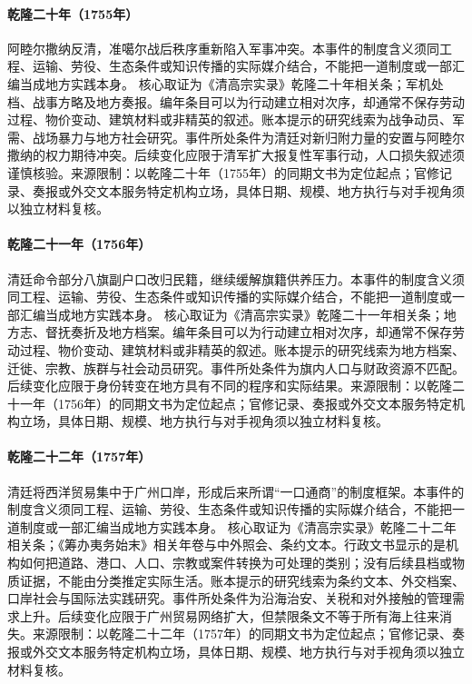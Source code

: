 \hypertarget{civic:EQ-1755-AMURSANA-REVOLT}{}\paragraph{乾隆二十年（1755年）}阿睦尔撒纳反清，准噶尔战后秩序重新陷入军事冲突。本事件的制度含义须同工程、运输、劳役、生态条件或知识传播的实际媒介结合，不能把一道制度或一部汇编当成地方实践本身。 核心取证为《清高宗实录》乾隆二十年相关条；军机处档、战事方略及地方奏报。编年条目可以为行动建立相对次序，却通常不保存劳动过程、物价变动、建筑材料或非精英的叙述。账本提示的研究线索为战争动员、军需、战场暴力与地方社会研究。事件所处条件为清廷对新归附力量的安置与阿睦尔撒纳的权力期待冲突。后续变化应限于清军扩大报复性军事行动，人口损失叙述须谨慎核验。来源限制：以乾隆二十年（1755年）的同期文书为定位起点；官修记录、奏报或外交文本服务特定机构立场，具体日期、规模、地方执行与对手视角须以独立材料复核。
\hypertarget{civic:EQ-1756-BANNER-CIVILIAN-REGISTRATION}{}\paragraph{乾隆二十一年（1756年）}清廷命令部分八旗副户口改归民籍，继续缓解旗籍供养压力。本事件的制度含义须同工程、运输、劳役、生态条件或知识传播的实际媒介结合，不能把一道制度或一部汇编当成地方实践本身。 核心取证为《清高宗实录》乾隆二十一年相关条；地方志、督抚奏折及地方档案。编年条目可以为行动建立相对次序，却通常不保存劳动过程、物价变动、建筑材料或非精英的叙述。账本提示的研究线索为地方档案、迁徙、宗教、族群与社会动员研究。事件所处条件为旗内人口与财政资源不匹配。后续变化应限于身份转变在地方具有不同的程序和实际结果。来源限制：以乾隆二十一年（1756年）的同期文书为定位起点；官修记录、奏报或外交文本服务特定机构立场，具体日期、规模、地方执行与对手视角须以独立材料复核。
\hypertarget{civic:EQ-1757-CANTON-TRADE-RESTRICTION}{}\paragraph{乾隆二十二年（1757年）}清廷将西洋贸易集中于广州口岸，形成后来所谓“一口通商”的制度框架。本事件的制度含义须同工程、运输、劳役、生态条件或知识传播的实际媒介结合，不能把一道制度或一部汇编当成地方实践本身。 核心取证为《清高宗实录》乾隆二十二年相关条；《筹办夷务始末》相关年卷与中外照会、条约文本。行政文书显示的是机构如何把道路、港口、人口、宗教或案件转换为可处理的类别；没有后续县档或物质证据，不能由分类推定实际生活。账本提示的研究线索为条约文本、外交档案、口岸社会与国际法实践研究。事件所处条件为沿海治安、关税和对外接触的管理需求上升。后续变化应限于广州贸易网络扩大，但禁限条文不等于所有海上往来消失。来源限制：以乾隆二十二年（1757年）的同期文书为定位起点；官修记录、奏报或外交文本服务特定机构立场，具体日期、规模、地方执行与对手视角须以独立材料复核。

